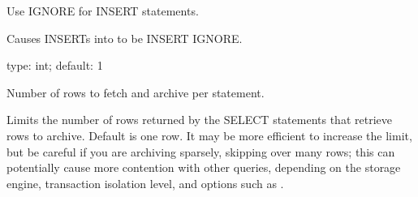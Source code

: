 \documentclass[letterpaper,10pt,english]{sphinxmanual}
\begin{document}

\begin{fulllineitems}
\label{\detokenize{mariadb-archiver:cmdoption-mariadb-archiver-ignore}}
\sphinxAtStartPar
Use IGNORE for INSERT statements.

\sphinxAtStartPar
Causes INSERTs into {\hyperref[\detokenize{mariadb-archiver:cmdoption-mariadb-archiver-dest}]{}} to be INSERT IGNORE.

\end{fulllineitems}


\begin{fulllineitems}
\label{\detokenize{mariadb-archiver:cmdoption-mariadb-archiver-limit}}
\sphinxAtStartPar
type: int; default: 1

\sphinxAtStartPar
Number of rows to fetch and archive per statement.

\sphinxAtStartPar
Limits the number of rows returned by the SELECT statements that retrieve rows
to archive.  Default is one row.  It may be more efficient to increase the
limit, but be careful if you are archiving sparsely, skipping over many rows;
this can potentially cause more contention with other queries, depending on the
storage engine, transaction isolation level, and options such as
{\hyperref[\detokenize{mariadb-archiver:cmdoption-mariadb-archiver-for-update}]{}}.

\end{fulllineitems}
\end{document}
